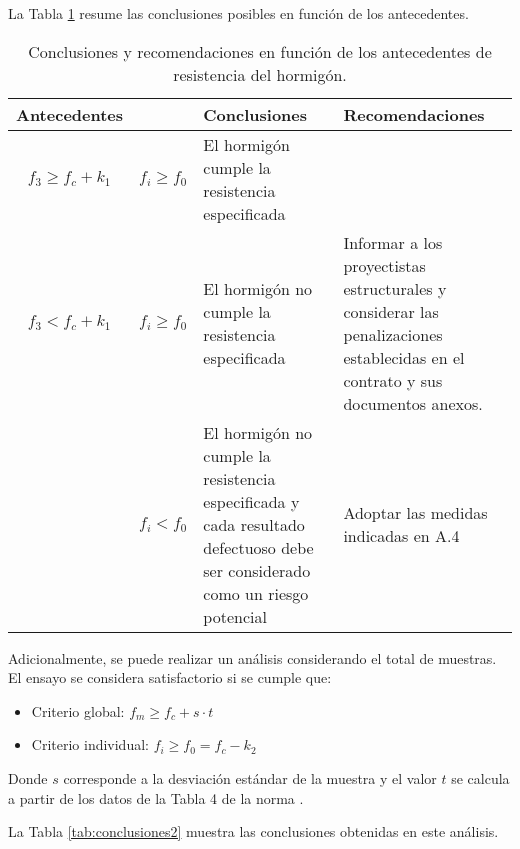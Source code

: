 La Tabla \ref{tab:conclusiones} resume las conclusiones posibles en función de los antecedentes.

\begin{table}[H]
\centering
\begin{tabular}{|c|c|p{6cm}|p{6cm}|}
\hline
\textbf{Antecedentes} &  & \textbf{Conclusiones} & \textbf{Recomendaciones} \\ \hline
$f_{3} \geq f_{c} + k_{1}$ & $f_{i} \geq f_{0}$ & 
El hormigón cumple la resistencia especificada & \\ \hline

$f_{3} < f_{c} + k_{1}$ & $f_{i} \geq f_{0}$ & 
El hormigón no cumple la resistencia especificada & 
Informar a los proyectistas estructurales y considerar las penalizaciones establecidas en el contrato y sus documentos anexos. \\ \hline

 & $f_{i} < f_{0}$ & 
El hormigón no cumple la resistencia especificada y cada resultado defectuoso debe ser considerado como un riesgo potencial & 
Adoptar las medidas indicadas en A.4 \\ \hline
\end{tabular}
\caption{Conclusiones y recomendaciones en función de los antecedentes de resistencia del hormigón.}
\label{tab:conclusiones}
\end{table}

Adicionalmente, se puede realizar un análisis considerando el total de muestras. El ensayo se considera satisfactorio si se cumple que:

\begin{itemize}
    \item Criterio global: $f_{m} \geq f_{c} + s \cdot t$
    \item Criterio individual: $f_{i} \geq f_{0} = f_c - k_2$
\end{itemize}

Donde $s$ corresponde a la desviación estándar de la muestra y el valor $t$ se calcula a partir de los datos de la Tabla 4 de la norma \cite{NCh1998}.

La Tabla \ref{tab:conclusiones2} muestra las conclusiones obtenidas en este análisis.

